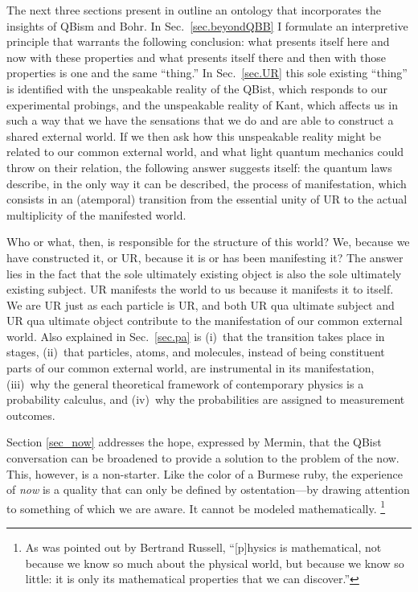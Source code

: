 \documentclass[smallextended]{svjour3}
\begin{document}
The next three sections present in outline an ontology that incorporates the insights of QBism and Bohr.\cite{Mohrhoff_Manifesting,Mohrhoff_NewLight,TWATQM} In Sec.~\ref{sec.beyondQBB} I formulate an interpretive principle that warrants the following conclusion: what presents itself here and now with these properties and what presents itself there and then with those properties is one and the same ``thing.'' In Sec.~\ref{sec.UR} this sole existing ``thing'' is identified with the unspeakable reality of the QBist, which responds to our experimental probings, and the unspeakable reality of Kant, which affects us
in such a way that we have the sensations that we do and are able to construct a shared external world. If we then ask how this unspeakable reality might be related to our common external world, and what light quantum mechanics could throw on their relation, the following answer suggests itself: the quantum laws describe, in the only way it can be described, the process of manifestation, which consists in an (atemporal) transition from the essential unity of UR to the actual {multiplicity} of the manifested world.

Who or what, then, is responsible for the structure of this world? We, because we have constructed it, or UR, because it is or has been manifesting it? The answer lies in the fact that the sole ultimately existing object is also the sole ultimately existing subject. UR manifests the world to us because it manifests it to itself. We are UR just as each particle is UR, and both UR qua ultimate subject and UR qua ultimate object contribute to the manifestation of our common external world. Also explained in Sec.~\ref{sec.pa} is (i)~that the transition takes place in stages, (ii)~that particles, atoms, and molecules, instead of being constituent parts of our common external world, are instrumental in its manifestation, (iii)~why the general theoretical framework of contemporary physics is a probability calculus, and (iv)~why the probabilities are assigned to measurement outcomes. 

Section \ref{sec_now} addresses the hope, expressed by Mermin,\cite{Mermin_Nature} that the QBist conversation can be broadened to provide a solution to the problem of the now. This, however, is a non-starter. Like the color of a Burmese ruby, the experience of \emph{now} is a quality that can only be defined by {ostentation}---by drawing attention to something of which we are aware. It cannot be modeled mathematically.%
\footnote{As was pointed out by Bertrand Russell,\cite{RussellOutline} ``[p]hysics is mathematical, not because we know so much about the physical world, but because we know so little: it is only its mathematical properties that we can discover.''}
\end{document}
